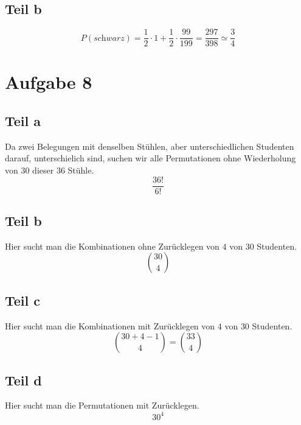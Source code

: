 \documentclass[10pt,a4paper]{article}
\begin{document}
\subsection{Teil b}
\begin{equation}
  P(\textit{schwarz}) = \frac{1}{2} \cdot 1 + \frac{1}{2} \cdot \frac{99}{199} = \frac{297}{398} \simeq \frac{3}{4}
\end{equation}

\section{Aufgabe 8}

\subsection{Teil a}
Da zwei Belegungen mit denselben Stühlen, aber unterschiedlichen Studenten darauf, unterschielich sind, suchen wir alle Permutationen ohne Wiederholung von $30$ dieser $36$ Stühle.
\begin{equation}
  \frac{36!}{6!} 
\end{equation}

\subsection{Teil b}
Hier sucht man die Kombinationen ohne Zurücklegen von $4$ von $30$ Studenten.
\begin{equation}
  \binom{30}{4}
\end{equation}

\subsection{Teil c}
Hier sucht man die Kombinationen mit Zurücklegen von $4$ von $30$ Studenten.
\begin{equation}
  \binom{30 + 4 - 1}{4} = \binom{33}{4}
\end{equation}

\subsection{Teil d}
Hier sucht man die Permutationen mit Zurücklegen.
\begin{equation}
  30^{4}
\end{equation}
\end{document}
